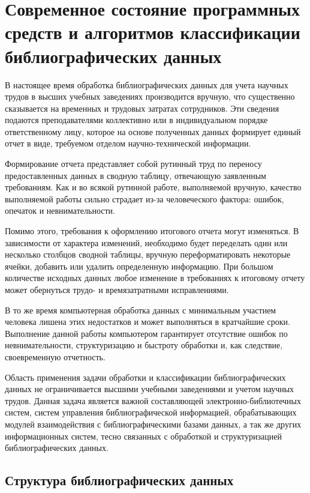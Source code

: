 \chapter{Современное состояние программных средств и алгоритмов классификации библиографических данных}

В настоящее время обработка библиографических данных для учета научных трудов в высших учебных заведениях производится вручную, что существенно сказывается на временных и трудовых затратах сотрудников. Эти сведения подаются преподавателями коллективно или в индивидуальном порядке ответственному лицу, которое на основе полученных данных формирует единый отчет в виде, требуемом отделом научно-технической информации. 

Формирование отчета представляет собой рутинный труд по переносу предоставленных данных в сводную таблицу, отвечающую заявленным требованиям. Как и во всякой рутинной работе, выполняемой вручную, качество выполняемой работы сильно страдает из-за человеческого фактора: ошибок, опечаток и невнимательности.

Помимо этого, требования к оформлению итогового отчета могут изменяться. В зависимости от характера изменений, необходимо будет переделать один или несколько столбцов сводной таблицы, вручную переформатировать некоторые ячейки, добавить или удалить определенную информацию. При большом количестве исходных данных любое изменение в требованиях к итоговому отчету может обернуться трудо- и времязатратными  исправлениями.

В то же время компьютерная обработка данных с минимальным участием человека лишена этих недостатков и может выполняться в кратчайшие сроки. Выполнение данной работы компьютером гарантирует отсутствие ошибок по невнимательности, структуризацию и быстроту обработки и, как следствие, своевременную отчетность.

Область применения задачи обработки и классификации библиографических данных не ограничивается высшими учебными заведениями и учетом научных трудов. Данная задача является важной составляющей электронно-библиотечных систем, систем управления библиографической информацией, обрабатывающих модулей взаимодействия с библиографическими базами данных, а так же других информационных систем, тесно связанных с обработкой и структуризацией библиографических данных.

\section{Структура библиографических данных}

